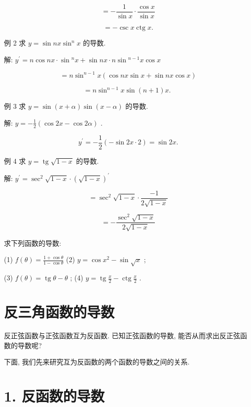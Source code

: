 \documentclass[lang=cn,newtx,10pt,scheme=chinese]{elegantbook}
\begin{document}
\[
= - \frac{1}{\sin x} \cdot \frac{\cos x}{\sin x}
\]

\[
= - \csc x\operatorname{ctg}x\text{.}
\]

例 2 求 \(y = \sin {nx}{\sin }^{n}x\) 的导数.

解: \({y}^{\prime } = n\cos {nx} \cdot \sin {}^{n}x + \sin {nx} \cdot n\sin {}^{n - 1}x\cos x\)

\[
= n{\sin }^{n - 1}x\left( {\cos {nx}\sin x + \sin {nx}\cos x}\right)
\]

\[
= n{\sin }^{n - 1}x\sin \left( {n + 1}\right) x\text{. }
\]

例 3 求 \(y = \sin \left( {x + \alpha }\right) \sin \left( {x - \alpha }\right)\) 的导数.

解: \(y = - \frac{1}{2}\left( {\cos {2x} - \cos {2\alpha }}\right)\) .

\[
{y}^{\prime } = - \frac{1}{2}\left( {-\sin {2x} \cdot 2}\right) = \sin {2x}.
\]

例 4 求 \(y = \operatorname{tg}\sqrt{1 - x}\) 的导数.

解: \({y}^{\prime } = {\sec }^{2}\sqrt{1 - x} \cdot {\left( \sqrt{1 - x}\right) }^{\prime }\)

\[
= {\sec }^{2}\sqrt{1 - x} \cdot \frac{-1}{2\sqrt{1 - x}}
\]

\[
= - \frac{{\sec }^{2}\sqrt{1 - x}}{2\sqrt{1 - x}}
\]

\begin{problemset}[练习]

\item 求下列函数的导数:

(1) \(f\left( \theta \right) = \frac{1 + \cos \theta }{1 - \cos \theta }\) (2) \(y = \cos {x}^{2} - \sin \sqrt{x}\) ;

(3) \(f\left( \theta \right) = \operatorname{tg}\theta - \theta\) ; (4) \(y = \operatorname{tg}\frac{x}{2} - \operatorname{ctg}\frac{x}{2}\) .

\end{problemset}

\section{反三角函数的导数}

反正弦函数与正弦函数互为反函数. 已知正弦函数的导数, 能否从而求出反正弦函数的导数呢?

下面, 我们先来研究互为反函数的两个函数的导数之间的关系.

\section*{1. 反函数的导数}
\end{document}
